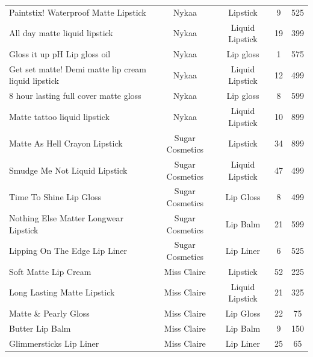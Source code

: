 \documentclass{article}
\begin{document}
\begin{longtable}{lcccc}
    Paintstix! Waterproof Matte Lipstick                & Nykaa           & Lipstick        & 9               & 525            \\
    All day matte liquid lipstick                       & Nykaa           & Liquid Lipstick & 19              & 399            \\
    Gloss it up pH Lip gloss oil                        & Nykaa           & Lip gloss       & 1               & 575            \\
    Get set matte! Demi matte lip cream liquid lipstick & Nykaa           & Liquid Lipstick & 12              & 499            \\
    8 hour lasting full cover matte gloss               & Nykaa           & Lip gloss       & 8               & 599            \\
    Matte tattoo liquid lipstick                        & Nykaa           & Liquid Lipstick & 10              & 899            \\
    Matte As Hell Crayon Lipstick                       & Sugar Cosmetics & Lipstick        & 34              & 899            \\
    Smudge Me Not Liquid Lipstick                       & Sugar Cosmetics & Liquid Lipstick & 47              & 499            \\
    Time To Shine Lip Gloss                             & Sugar Cosmetics & Lip Gloss       & 8               & 499            \\
    Nothing Else Matter Longwear Lipstick               & Sugar Cosmetics & Lip Balm        & 21              & 599            \\
    Lipping On The Edge Lip Liner                       & Sugar Cosmetics & Lip Liner       & 6               & 525            \\
    Soft Matte Lip Cream                                & Miss Claire     & Lipstick        & 52              & 225            \\
    Long Lasting Matte Lipstick                         & Miss Claire     & Liquid Lipstick & 21              & 325            \\
    Matte \& Pearly Gloss                               & Miss Claire     & Lip Gloss       & 22              & 75             \\
    Butter Lip Balm                                     & Miss Claire     & Lip Balm        & 9               & 150            \\
    Glimmersticks Lip Liner                             & Miss Claire     & Lip Liner       & 25              & 65             \\

\end{longtable}
\end{document}
